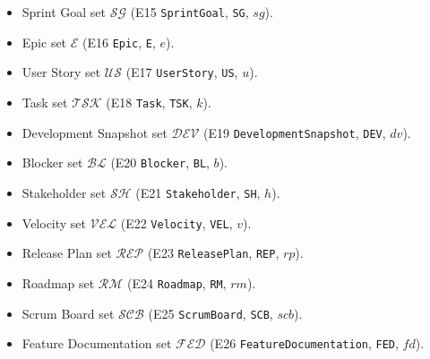 \documentclass[11pt,a4paper]{article}
\begin{document}
\begin{itemize}[leftmargin=2em]
  \item Sprint Goal set $\mathcal{SG}$ (E15 \texttt{SprintGoal}, \texttt{SG}, $sg$).
  \item Epic set $\mathcal{E}$ (E16 \texttt{Epic}, \texttt{E}, $e$).
  \item User Story set $\mathcal{US}$ (E17 \texttt{UserStory}, \texttt{US}, $u$).
  \item Task set $\mathcal{TSK}$ (E18 \texttt{Task}, \texttt{TSK}, $k$).
  \item Development Snapshot set $\mathcal{DEV}$ (E19 \texttt{DevelopmentSnapshot}, \texttt{DEV}, $dv$).
  \item Blocker set $\mathcal{BL}$ (E20 \texttt{Blocker}, \texttt{BL}, $b$).
  \item Stakeholder set $\mathcal{SH}$ (E21 \texttt{Stakeholder}, \texttt{SH}, $h$).
  \item Velocity set $\mathcal{VEL}$ (E22 \texttt{Velocity}, \texttt{VEL}, $v$).
  \item Release Plan set $\mathcal{REP}$ (E23 \texttt{ReleasePlan}, \texttt{REP}, $rp$).
  \item Roadmap set $\mathcal{RM}$ (E24 \texttt{Roadmap}, \texttt{RM}, $rm$).
  \item Scrum Board set $\mathcal{SCB}$ (E25 \texttt{ScrumBoard}, \texttt{SCB}, $scb$).
  \item Feature Documentation set $\mathcal{FED}$ (E26 \texttt{FeatureDocumentation}, \texttt{FED}, $fd$).


\end{itemize}
\end{document}
